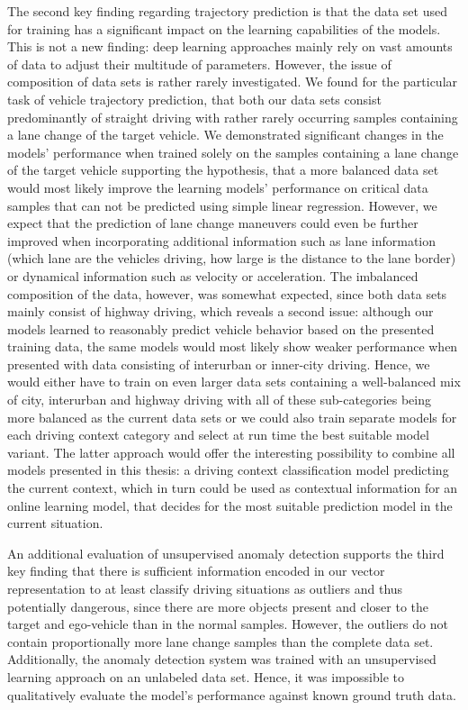 The second key finding regarding trajectory prediction is that the data set used for training has a significant impact on the learning capabilities of the models.
This is not a new finding: deep learning approaches mainly rely on vast amounts of data to adjust their multitude of parameters.
However, the issue of composition of data sets is rather rarely investigated.
We found for the particular task of vehicle trajectory prediction, that both our data sets consist predominantly of straight driving with rather rarely occurring samples containing a lane change of the target vehicle.
We demonstrated significant changes in the models' performance when trained solely on the samples containing a lane change of the target vehicle supporting the hypothesis, that a more balanced data set would most likely improve the learning models' performance on critical data samples that can not be predicted using simple linear regression.
However, we expect that the prediction of lane change maneuvers could even be further improved when incorporating additional information such as lane information (which lane are the vehicles driving, how large is the distance to the lane border) or dynamical information such as velocity or acceleration.
The imbalanced composition of the data, however, was somewhat expected, since both data sets mainly consist of highway driving, which reveals a second issue: although our models learned to reasonably predict vehicle behavior based on the presented training data, the same models would most likely show weaker performance when presented with data consisting of interurban or inner-city driving.
Hence, we would either have to train on even larger data sets containing a well-balanced mix of city, interurban and highway driving with all of these sub-categories being more balanced as the current data sets or we could also train separate models for each driving context category and select at run time the best suitable model variant.
The latter approach would offer the interesting possibility to combine all models presented in this thesis: a driving context classification model predicting the current context, which in turn could be used as contextual information for an online learning model, that decides for the most suitable prediction model in the current situation.

An additional evaluation of unsupervised anomaly detection supports the third key finding that there is sufficient information encoded in our vector representation to at least classify driving situations as outliers and thus potentially dangerous, since there are more objects present and closer to the target and ego-vehicle than in the normal samples.
However, the outliers do not contain proportionally more lane change samples than the complete data set.
Additionally, the anomaly detection system was trained with an unsupervised learning approach on an unlabeled data set.
Hence, it was impossible to qualitatively evaluate the model's performance against known ground truth data.

